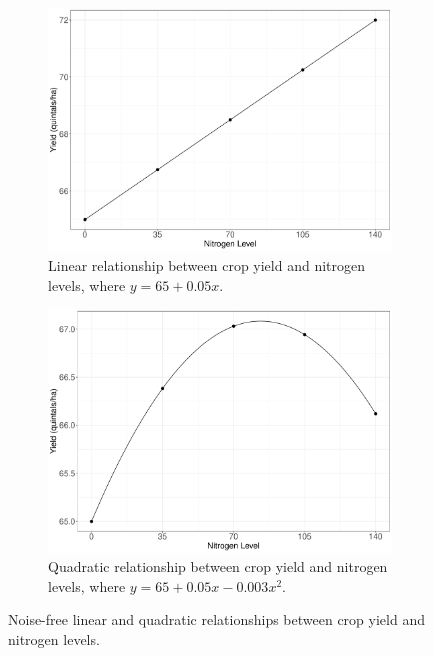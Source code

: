 \documentclass[a4paper]{article} 	%
\begin{document}
\begin{figure}[!htp]
	\begin{subfigure}[t]{0.45\textwidth}
		\centering
		\includegraphics[width=\linewidth]{Expt/LinlinesV2.pdf}
		\caption{Linear relationship between crop yield and nitrogen levels, where $y=65+0.05x$.}
	\end{subfigure}
	\hspace{0.05\textwidth}
	\begin{subfigure}[t]{0.45\textwidth}
		\centering
		\includegraphics[width=\linewidth]{Expt/QualinesV2.pdf}
		\caption{Quadratic relationship between crop yield and nitrogen levels, where $y=65+0.05x-0.003x^2$.}
	\end{subfigure}
	\caption{Noise-free linear and quadratic relationships between crop yield and nitrogen levels.}\label{fig:Lines}
\end{figure}
\end{document}
